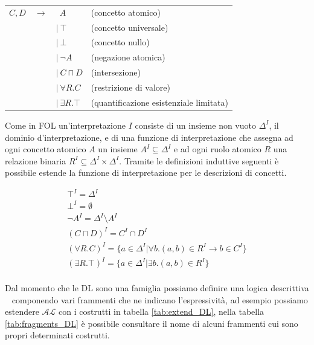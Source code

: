 \documentclass{article}
\begin{document}
\begin{table}[h!] 
    \centering
    \begin{tabular}{r c l l}
        $ C, D $ & $ \rightarrow $ & $ \ \ A $ & (concetto atomico) \\
        & & $ | \ \top $ & (concetto universale) \\
        & & $ | \ \bot $ & (concetto nullo) \\
        & & $ | \ \neg A $ & (negazione atomica) \\
        & & $ | \ C \sqcap D $ & (intersezione) \\
        & & $ | \ \forall R.C $ & (restrizione di valore) \\
        & & $ | \ \exists R.\top $ & (quantificazione esistenziale limitata) \\
    \end{tabular}
\end{table}

Come in FOL un'interpretazione $I$ consiste di un insieme non vuoto $\Delta^{I}$, il dominio d'interpretazione, e di una funzione di interpretazione che assegna ad ogni concetto atomico $A$ un insieme $A^{I} \subseteq \Delta^{I}$ e ad ogni ruolo atomico $R$ una relazione binaria $R^{I} \subseteq \Delta^{I} \times \Delta^{I}$. Tramite le definizioni induttive seguenti è possibile estende la funzione di interpretazione per le descrizioni di concetti.

\begin{gather*}
    \top^{I} = \Delta^{I} \\
    \bot^{I} = \emptyset \\
    \neg A^{I} = \Delta^{I} \setminus A^{I} \\
    (C \sqcap D)^{I} = C^{I} \cap D^{I} \\
    (\forall R.C)^{I} = \{ a \in \Delta^{I} | \forall b.(a,b) \in R^{I} \rightarrow b \in C^{I} \} \\
    (\exists R.\top)^{I} = \{ a \in \Delta^{I} | \exists b.(a,b) \in R^{I} \} \\
\end{gather*}

Dal momento che le DL sono una famiglia possiamo definire una logica descrittiva ~\cite[Appendix 1]{dl:handbook} componendo vari frammenti che ne indicano l'espressività, ad esempio possiamo estendere $ \mathcal{AL} $ con i costrutti in tabella \ref{tab:extend_DL}, nella tabella \ref{tab:fragments_DL} è possibile consultare il nome di alcuni frammenti cui sono propri determinati costrutti.
\end{document}
